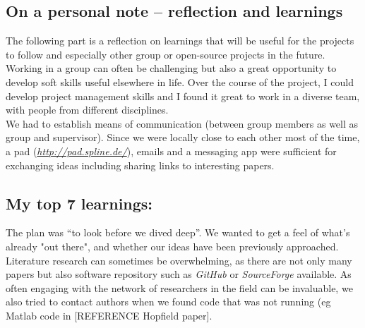 \documentclass[journal, a4paper]{IEEEtran}
\begin{document}



\subsection{\textbf{On a personal note -- reflection and learnings}}



The following part is a reflection on learnings that will be useful for the projects to follow and especially other group or open-source projects in the future.\\


Working in a group can often be challenging but also a great opportunity to develop soft skills useful elsewhere in life. Over the course of the project, I could develop project management skills and I found it great to work in a diverse team, with people from different disciplines. \\
We had to establish means of communication (between group members as well as group and supervisor). Since we were locally close to each other most of the time, a pad (\textit{\url{http://pad.spline.de/}}), emails and a messaging app were sufficient for exchanging ideas including sharing links to interesting papers.

\subsection{My top 7 learnings:}

The plan was “to look before we dived deep”. We wanted to get a feel of what's already "out there", and whether our ideas have been previously approached. Literature research can sometimes be overwhelming, as there are not only many papers but also software repository such as \textit{GitHub} or \textit{SourceForge} available. As often engaging with the network of researchers in the field can be invaluable, we also tried to contact authors when we found code that was not running (eg Matlab code in [REFERENCE Hopfield paper].
\end{document}

